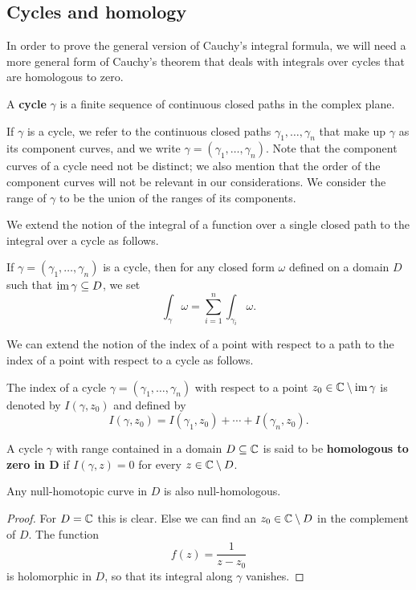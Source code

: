 \subsection{Cycles and homology}
In order to prove the general version of Cauchy's integral formula, we will need a more general form of Cauchy's theorem that deals with integrals over cycles that are homologous to zero.
\begin{definition}
A \textbf{cycle} $\gamma$ is a finite sequence of continuous closed paths in the complex plane.
\end{definition}
If $\gamma$ is a cycle, we refer to the continuous closed paths $\gamma_1,\dots,\gamma_n$ that make up $\gamma$ as its component curves, and we write $\gamma=(\gamma_1,\dots,\gamma_n)$. Note that the component curves of a cycle need not be distinct; we also mention that the order of the component curves will not be relevant in our considerations. We consider the range of $\gamma$ to be the union of the ranges of its components.\par
We extend the notion of the integral of a function over a single closed path to the integral over a cycle as follows.
\begin{definition}
If $\gamma=(\gamma_1,\dots,\gamma_n)$ is a cycle, then for any closed form $\omega$ defined on a domain $D$ such that $\mathrm{im}\,\gamma\subseteq D$, we set
\[\int_{\gamma}\omega=\sum_{i=1}^{n}\int_{\gamma_i}\omega.\]
\end{definition}
We can extend the notion of the index of a point with respect to a path to the index of a point with respect to a cycle as follows.
\begin{definition}
The index of a cycle $\gamma=(\gamma_1,\dots,\gamma_n)$ with respect to a point $z_0\in\mathbb{C}\setminus\mathrm{im}\,\gamma$ is denoted by $I(\gamma,z_0)$ and defined by
\[I(\gamma,z_0)=I(\gamma_1,z_0)+\cdots+I(\gamma_n,z_0).\]
\end{definition}
\begin{definition}
A cycle $\gamma$ with range contained in a domain $D\subseteq\mathbb{C}$ is said to be \textbf{homologous to zero in $\bm{D}$} if $I(\gamma,z)=0$ for every $z\in\mathbb{C}\setminus D$.
\end{definition}
\begin{proposition}
Any null-homotopic curve in $D$ is also null-homologous.
\end{proposition}
\begin{proof}
For $D=\mathbb{C}$ this is clear. Else we can find an $z_0\in\mathbb{C}\setminus D$ in the complement of $D$. The function
\[f(z)=\frac{1}{z-z_0}\]
is holomorphic in $D$, so that its integral along $\gamma$ vanishes.
\end{proof}
